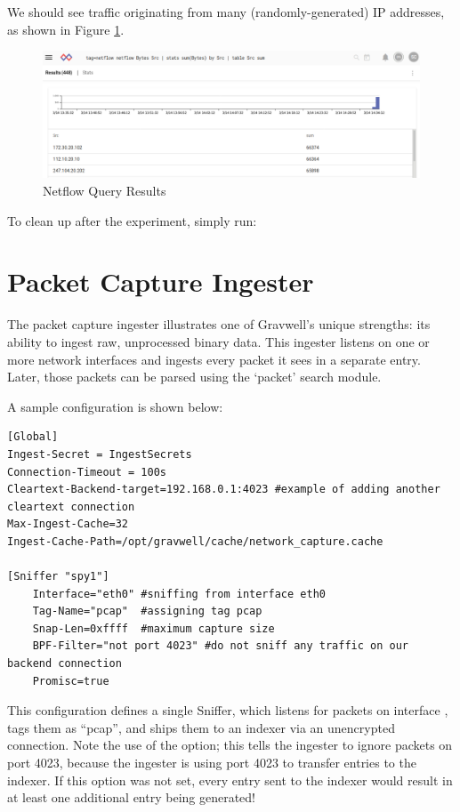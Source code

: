 We should see traffic originating from many (randomly-generated) IP addresses, as shown in Figure \ref{fig:netflow-lab}.

\begin{figure}
	\includegraphics{images/igst-netflow-lab.png}
	\caption{Netflow Query Results}
	\label{fig:netflow-lab}
\end{figure}

To clean up after the experiment, simply run:





\section{Packet Capture Ingester}

The packet capture ingester illustrates one of Gravwell's unique
strengths: its ability to ingest raw, unprocessed binary data. This
ingester listens on one or more network interfaces and ingests every
packet it sees in a separate entry. Later, those packets can be parsed
using the `packet' search module.

A sample configuration is shown below:

\begin{Verbatim}[breaklines=true]
[Global]
Ingest-Secret = IngestSecrets
Connection-Timeout = 100s
Cleartext-Backend-target=192.168.0.1:4023 #example of adding another cleartext connection
Max-Ingest-Cache=32
Ingest-Cache-Path=/opt/gravwell/cache/network_capture.cache

[Sniffer "spy1"]
    Interface="eth0" #sniffing from interface eth0
    Tag-Name="pcap"  #assigning tag pcap
    Snap-Len=0xffff  #maximum capture size
    BPF-Filter="not port 4023" #do not sniff any traffic on our backend connection
    Promisc=true
\end{Verbatim}

This configuration defines a single Sniffer, which listens for packets
on interface , tags them as ``pcap'', and ships them to an
indexer via an unencrypted connection. Note the use of the
 option; this tells the ingester to ignore packets on port
4023, because the ingester is using port 4023 to transfer entries to the
indexer. If this option was not set, every entry sent to the indexer
would result in at least one additional entry being generated!

